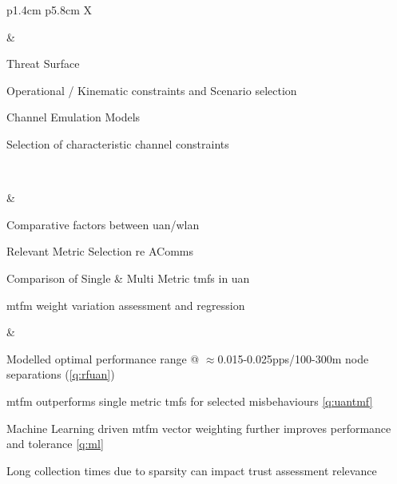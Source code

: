 \begin{table}
{\begin{tabularx}{\textwidth}{p{1.4cm} p{5.8cm} X}
\begin{minipage}[t]{\linewidth}
\begin{tightimize}
				\end{tightimize}
			\end{minipage}
			& \begin{minipage}[t]{\linewidth}
				\begin{tightimize} 
					\item Threat Surface
					\item Operational / Kinematic constraints and Scenario selection
					\item Channel Emulation Models
					\item Selection of characteristic channel constraints
				\end{tightimize}
			\end{minipage}\\\midrule
			\begin{minipage}[t][][b]{\linewidth}\end{minipage}
			& \begin{minipage}[t]{\linewidth}
				\begin{tightimize} 
					\item Comparative factors between \gls{uan}/\gls{wlan}
					\item Relevant Metric Selection re AComms
					\item Comparison of Single \& Multi Metric \glspl{tmf} in \gls{uan}
					\item \gls{mtfm} weight variation assessment and regression
				\end{tightimize}
			\end{minipage}
			& \begin{minipage}[t]{\linewidth}
				\begin{tightimize} 
					\item Modelled optimal performance range @ $\approx$0.015-0.025pps/100-300m node separations  (\autoref{q:rfuan})
					\item \gls{mtfm} outperforms single metric \glspl{tmf} for selected misbehaviours \autoref{q:uantmf}
					\item Machine Learning driven \gls{mtfm} vector weighting further improves performance and tolerance \autoref{q:ml}
					\item Long collection times due to sparsity can impact trust assessment relevance
				\end{tightimize}
			\end{minipage}\\\midrule
			

\end{tabularx}}
\end{table}

